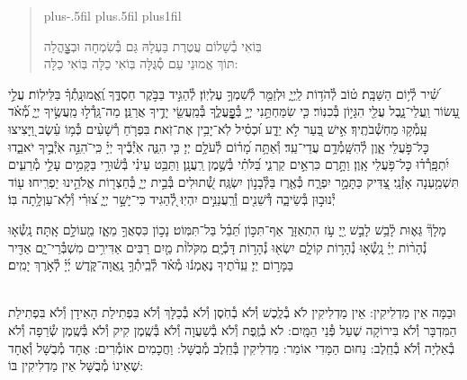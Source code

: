 \documentclass[twoside, openany, parskip=half, 11pt]{book}
\begin{document}
\begin{quote}
\leftskip=0pt plus-.5fil
\rightskip=0pt plus.5fil
\parfillskip=0pt plus1fil

בּֽוֹאִי בְ֯שָׁלוֹם עֲטֶרֶת בַּעְלָהּ \hfill
גַּם בְּ֯שִׂמְחָה וּבְצׇׇׇׇׇׇׇׇׇהֳלָה \\
תּוֹךְ אֱמוּנֵי עַם סְ֯גֻּלָּה \hfill
בּֽוֹאִי כַלָּה בּֽוֹאִי כַלָּה:

\lechadodi

\end{quote}


שִׁ֝֗יר לְ֯י֥וֹם הַשַּׁבָּֽת׃
ט֗וֹב לְ֯הֹד֥וֹת לַֽיְיָ֑ וּלְזַמֵּ֖ר לְ֯שִׁמְךָ֣ עֶלְיֽוֹן׃
לְ֯הַגִּ֣יד בַּבֹּ֣קֶר חַסְדֶּ֑ךָ וֶֽ֝אֱמוּנָֽתְ֯ךָ֗ בַּלֵּילֽוֹת׃
עֲלֵ֣י עָ֭שׂוֹר וַֽעֲלֵי־נָ֑בֶל עֲלֵ֖י הִגָּי֣וֹן בְּ֯כִנּֽוֹר׃
כִּ֤י שִׂמַּחְתַּ֣נִי יְיָ֣ בְּ֯פׇׇׇׇׇׇׇׇֽעֳלֶ֑ךָ בְּ֯מַֽעֲשֵׂ֖י יָדֶ֣יךָ אֲרַנֵּֽן׃
מַה־גָּֽדְ֯ל֣וּ מַֽעֲשֶׂ֣יךָ יְיָ֑ מְ֝֯אֹ֗ד עָֽמְ֯ק֥וּ מַחְשְׁ֯בֹתֶֽיךָ׃
אִ֣ישׁ בַּ֭עַר לֹ֣א יֵדָ֑ע וּ֝כְסִ֗יל לֹֽא־יָבִ֥ין אֶת־זֹֽאת׃
בִּפְרֹ֤חַ רְ֯שָׁעִ֨ים כְּ֯מ֥וֹ עֵ֗שֶׂב וַ֭יָּצִיצוּ כׇּל־פֹּ֣עֲלֵי אָ֑וֶן לְ֯הִשָּֽׁמְ֯דָ֥ם עֲדֵי־עַֽד׃
וְ֯אַתָּ֥ה מָ֝ר֗וֹם לְ֯עֹלָ֥ם יְיָ׃
כִּ֤י הִנֵּ֢ה אֹֽיְ֯בֶ֡יךָ יְיָ֗ כִּֽי־ֹהִנֵּ֣ה אֹֽיְ֯בֶ֣יךָ יֹאבֵ֑דוּ יִ֝תְפָּֽרְ֯ד֗וּ כׇּל־פֹּ֥עֲלֵי אָֽוֶן׃
וַתָּ֣רֶם כִּרְאֵ֣ים קַרְנִ֑י בַּ֝לֹּתִ֗י בְּ֯שֶׁ֣מֶן רַֽעֲנָֽן׃
וַתַּבֵּ֥ט עֵינִ֗י בְּ֯שׁ֫וּרָ֥י בַּקָּמִ֣ים עָלַ֣י מְ֯רֵעִ֑ים תִּשְׁמַ֥עְנָה אָזְ֯נָֽי׃
 צַ֭דִּיק כַּתָּמָ֣ר יִפְרָ֑ח כְּ֯אֶ֖רֶז בַּלְּ֯בָנ֣וֹן יִשְׂגֶּֽה׃
שְׁ֭֯תוּלִים בְּ֯בֵ֣ית יְיָ֑ בְּ֯חַצְר֖וֹת אֱלֹהֵ֣ינוּ יַפְרִֽיחוּ׃
ע֖וֹד יְ֯נוּב֣וּן בְּ֯שֵׂיבָ֑ה דְּ֯שֵׁנִ֖ים וְ֯רַֽעֲנַנִּ֣ים יִהְיֽוּ׃
לְ֭֯הַגִּיד כִּי־יָשָׁ֣ר יְיָ֑ צ֝וּרִ֗י וְ֯לֹֽא־עַוְלָ֥תָה בּֽוֹ׃

מָלָךְ֘ גֵּא֢וּת לָ֫בֵ֥שׁ לָבֵ֣שׁ יְ֖יָ עֹ֣ז הִתְאַזָּר֑ אַף־תִּכּ֣וֹן תֵּ֝בֵ֗ל בַּל־תִּמּֽוֹט׃
נָכ֣וֹן כִּסְאֲךָ֣ מֵאָ֑ז מֵ֖עוֹלָ֣ם אָֽתָּה׃
נָֽשְׂ֯א֤וּ נְ֯הָר֨וֹת יְיָ֗ נָֽשְׂ֯א֣וּ נְ֯הָר֣וֹת קוֹלָ֑ם יִשְׂא֖וּ נְ֯הָר֣וֹת דָּכְ֯יָֽם׃
 מִקֹּלוֹ֨ת מַ֤יִם רַבִּים אַדִּירִ֥ים מִשְׁבְּ֯רֵי־יָ֑ם אַדִּ֖יר בַּמָּר֣וֹם יְיָ׃
עֵֽדֹ֨תֶיךָ נֶאֶמְנ֬וּ מְ֯אֹ֗ד לְ֯בֵֽיתְ֯ךָ֥ נָֽאֲוָה־קֹּ֑דֶשׁ יְ֜יָ֗ לְ֯אֹ֣רֶךְ יָמִֽים׃

\mournerskaddish


\\
וּבַמָּה אֵין מַדְלִיקִין: אֵין מַדְלִיקִין לֹא בְ֯לֶֽכֶשׁ וְ֯לֹא בְ֯חֹֽסֶן וְ֯לֹא בְ֯כַלָּךְ וְ֯לֹא בִּפְתִילַת הָאִידָן וְ֯לֹא בִּפְתִילַת הַמִּדְבָּר וְ֯לֹא בִּירוֹקָה שֶׁעַל פְּ֯נֵי הַמָּֽיִם: לֹא בְ֯זֶֽפֶת וְ֯לֹא בְ֯שַׁעֲוָה וְ֯לֹא בְּ֯שֶֽׁמֶן קִיק וְ֯לֹא בְּ֯שֶֽׁמֶן שְׂ֯רֵפָה וְ֯לֹא בְ֯אַלְיָה וְ֯לֹא בְ֯חֵֽלֶב: נַחוּם הַמָּדִי אוֹמֵר: מַדְלִיקִין בְּ֯חֵֽלֶב מְ֯בֻשָּׁל: וַחֲכָמִים אוֹמְ֯רִים: אֶחָד מְ֯בֻשָּׁל וְ֯אֶחָד שֶׁאֵינוֹ מְ֯בֻשָּׁל אֵין מַדְלִיקִין בּוֹ:
\end{document}
